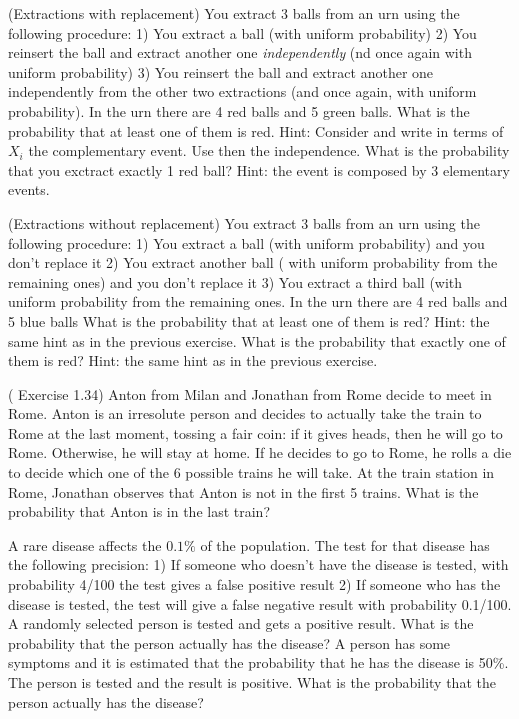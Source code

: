 \begin{ExerciseList}
	\Exercise (Extractions with replacement) You extract 3 balls from an urn using the following procedure: 1) You extract a ball (with uniform probability) 2) You reinsert the ball and extract another one \emph{independently} (nd once again with uniform probability)  3) You reinsert the ball and extract another one independently from the other two extractions (and once again, with uniform probability). In the urn there are 4 red balls and 5 green balls.
	\Question What is the probability that at least one of them is red. Hint: Consider 
	and write in terms of $X_i$ the complementary event. Use then the independence. 
	\Question What is the probability that you exctract exactly 1 red ball? Hint: the event is composed by 3 elementary events.
	
	\Exercise (Extractions without replacement) You extract 3 balls from an urn using the following procedure: 1) You extract a ball (with uniform probability) and you don't replace it 2) You extract another ball ( with uniform probability from the remaining ones) and you don't replace it 3) You extract a third  ball (with uniform probability from the remaining ones. In the urn there are 4 red balls and 5 blue balls
	\Question What is the probability that at least one of them is red? Hint: the same hint as in the previous exercise.
	\Question What is the probability that exactly one of them is red? Hint: the same hint as in the previous exercise. 

	\Exercise (\cite{daipra} Exercise 1.34) Anton from Milan and Jonathan from Rome decide to meet in Rome. Anton is an irresolute person and decides to actually take the train to Rome at the last moment, tossing a fair coin: if it gives heads, then he will go to Rome. Otherwise, he will stay at home. If he decides to go to Rome, he rolls a die to decide which one of the 6 possible trains he will take. At the train station in Rome, Jonathan observes that Anton is not in the first 5 trains. What is the probability that Anton is in the last train?   

	\Exercise  A rare disease affects the $0.1\%$ of the population. The test for that disease has the following precision: 1) If someone who doesn't have the disease is tested, with probability 4/100 the test gives a false positive result 2) If someone who has the disease is tested, the test will give a false negative result with probability 0.1/100. 
	\Question A randomly selected person is tested and gets a positive result. What is the probability that the person actually has the disease?   
	\Question A person has some symptoms and it is estimated that the probability that he has the disease is 50\%. The person is tested and the result is positive. What is the probability that the person actually has the disease?   


\end{ExerciseList}
